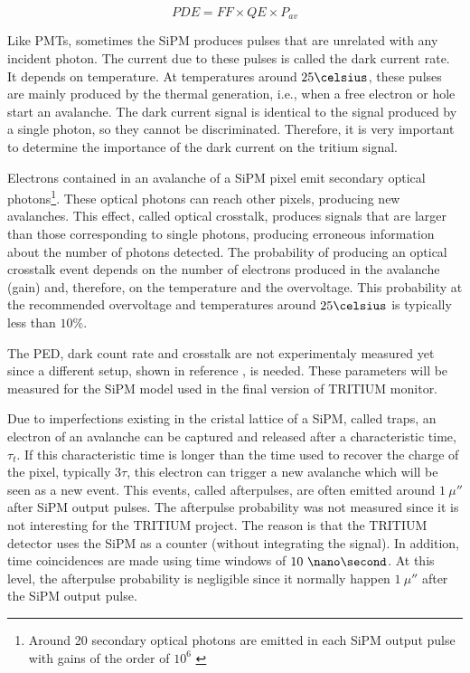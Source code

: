 \begin{equation}
PDE=FF \times QE \times P_{av}
\label{PDE_SiPM}
\end{equation}

Like PMTs, sometimes the SiPM produces pulses that are unrelated with any incident photon. The current due to these pulses is called the dark current rate. It depends on temperature. At temperatures around $25\celsius$, these pulses are mainly produced by the thermal generation, i.e., when a free electron or hole start an avalanche. The dark current signal is identical to the signal produced by a single photon, so they cannot be discriminated. Therefore, it is very important to determine the importance of the dark current on the tritium signal.

Electrons contained in an avalanche of a SiPM pixel emit secondary optical photons\footnote{Around 20 secondary optical photons are emitted in each SiPM output pulse with gains of the order of $10^6$ \cite{CrosstalkProbability}}. These optical photons can reach other pixels, producing new avalanches. This effect, called optical crosstalk, produces signals that are larger than those corresponding to single photons, producing erroneous information about the number of photons detected. The probability of producing an optical crosstalk event depends on the number of electrons produced in the avalanche (gain) and, therefore, on the temperature and the overvoltage. This probability at the recommended overvoltage and temperatures around $25\celsius$ is typically less than $10\%$.

The PED, dark count rate and crosstalk are not experimentaly measured yet since a different setup, shown in reference \cite{PDEStudy}, is needed. These parameters will be measured for the SiPM model used in the final version of TRITIUM monitor.

Due to imperfections existing in the cristal lattice of a SiPM, called traps, an electron of an avalanche can be captured and released after a characteristic time, $\tau_t$. If this characteristic time is longer than the time used to recover the charge of the pixel, typically $3\tau$, this electron can trigger a new avalanche which will be seen as a new event. This events, called  afterpulses, are often emitted around $1~\mu\second$ after SiPM output pulses. The afterpulse probability was not measured since it is not interesting for the TRITIUM project. The reason is that the TRITIUM detector uses the SiPM as a counter (without integrating the signal). In addition, time coincidences are made using time windows of $10~\nano\second$. At this level, the afterpulse probability is negligible since it normally happen $1~\mu\second$ after the SiPM output pulse.

